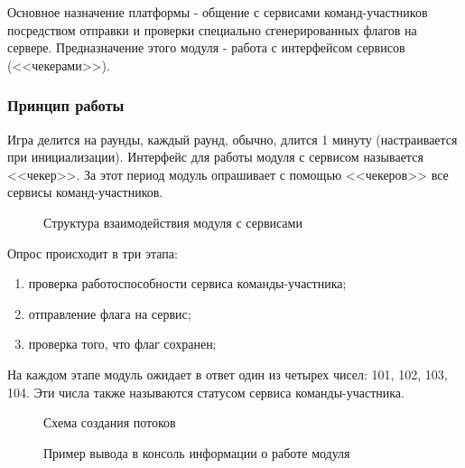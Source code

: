 Основное назначение платформы - общение с сервисами команд-участников посредством отправки и проверки специально сгенерированных флагов на сервере. Предназначение этого модуля - работа с интерфейсом сервисов (<<чекерами>>).

\subsubsection{Принцип работы}
Игра делится на раунды, каждый раунд, обычно, длится 1 минуту (настраивается при инициализации). Интерфейс для работы модуля с сервисом называется <<чекер>>. За этот период модуль опрашивает с помощью <<чекеров>> все сервисы команд-участников.

\begin{figure}[h!]
\caption{Структура взаимодействия модуля с сервисами}
\end{figure}

Опрос происходит в три этапа:
\begin{enumerate} 
\item проверка работоспособности сервиса команды-участника;
\item отправление флага на сервис; 
\item проверка того, что флаг сохранен;
\end{enumerate}

На каждом этапе модуль ожидает в ответ один из четырех чисел: 101, 102, 103, 104. Эти числа также называются статусом сервиса команды-участника.

\begin{figure}[h!]
\caption{Схема создания потоков}
\end{figure}
\begin{figure}[h!]
\caption{Пример вывода в консоль информации о работе модуля}
\end{figure}

